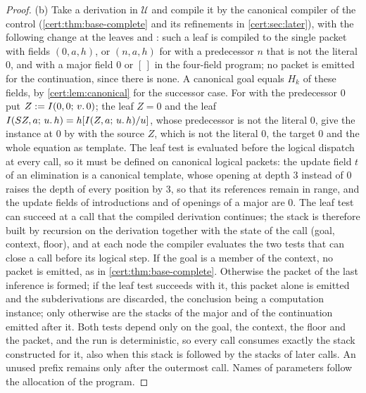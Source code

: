 \begin{proof}
(b) Take a derivation in $\mathcal U$ and compile it by the canonical compiler
of the control (\cref{cert:thm:base-complete} and its refinements in
\cref{cert:sec:later}), with the following change at the leaves 
and : such a leaf is compiled to the single packet with fields
$(0,a,h)$, or $(n,a,h)$ for  with a predecessor $n$ that is not
the literal $0$, and with a major field $0$ or $[\,]$ in the four-field
program; no packet is emitted for the continuation, since there is none. A
canonical goal equals $H_k$ of these fields, by \cref{cert:lem:canonical} for
the successor case. For  with the predecessor $0$ put
$Z\mathrel{:=}I(0,0;\,v.\,0)$; the leaf $Z=0$ and the leaf
$I(S Z,a;\,u.\,h)=h[I(Z,a;\,u.\,h)/u]$, whose predecessor is not
the literal $0$, give the instance at $0$ by  with the source $Z$,
which is not the literal $0$, the target $0$ and the whole equation as
template. The leaf test is evaluated before the logical dispatch at every
call, so it must be defined on canonical logical packets: the update field
$t$ of an elimination is a canonical template, whose opening at depth $3$
instead of $0$ raises the depth of every position by $3$, so that its
references remain in range, and the update fields of introductions and of
openings of a major are $0$. The leaf test can succeed at a call that the
compiled derivation continues; the stack is therefore built by recursion on
the derivation together with the state of the call (goal, context, floor),
and at each node the compiler evaluates the two tests that can close a call
before its logical step. If the goal is a member of the context, no packet is
emitted, as in \cref{cert:thm:base-complete}. Otherwise the packet of the last
inference is formed; if the leaf test succeeds with it, this packet alone is
emitted and the subderivations are discarded, the conclusion being a
computation instance; only otherwise are the stacks of the major and of the
continuation emitted after it. Both tests depend only on the goal, the context,
the floor and the packet, and the run is deterministic, so every call consumes
exactly the stack constructed for it, also when this stack is followed by the
stacks of later calls. An unused prefix remains only after the outermost call.
Names of parameters follow the allocation of the program.
\end{proof}

